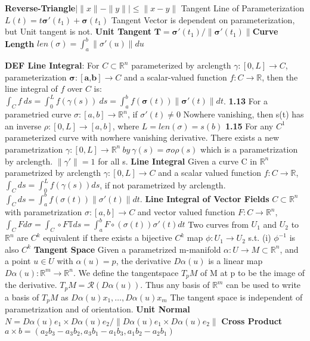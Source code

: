\documentclass[8pt]{extarticle}
\theoremstyle{definition}
\begin{document}
\textbf{Reverse-Triangle}$ | \|x\| - \|y\| | \leq \|x-y\|$ Tangent Line of Parameterization $L(t)  = t \mathbf{\sigma}'(t_1) + \mathbf{\sigma}(t_1) $ Tangent Vector is dependent on parameterization, but Unit tangent is not. \textbf{Unit Tangent} $\mathbf{T} = \mathbf{\sigma}'(t_1)/\|\mathbf{\sigma}'(t_1)  \|$\textbf{Curve Length} $len(\sigma) = \int^b_a \|\sigma ' (u)\|du$

\textbf{DEF Line Integral}: For $C \subset \mathbb{R}^n$ parameterized by arclength $\gamma: [0,L] \rightarrow C$, parameterization $\bm{\sigma}: [\textbf{a,b}] \rightarrow C$ and a scalar-valued function $f:C \rightarrow \mathbb{R}$, then the line integral of $f$ over $C$ is: $\int_C f~ds = \int_0^L f(\gamma(s))~ds = \int_a^b f(\bm{\sigma}(t)) \| \bm{\sigma}'(t) \| dt$. 
\textbf{1.13} For a parametried curve $\sigma: [a,b] \to \mathbb{R}^n$, if $\sigma'(t) \neq 0$ Nowhere vanishing, then s(t) has an inverse $\rho: [0,L] \to [a,b]$, where $L = len(\sigma) = s(b)$
\textbf{1.15} For any $C^1$ parameterized curve with nowhere vanishing derivative. There exists a new parametrization $\gamma:[0,L] \to \mathbb{R}^n~by~\gamma(s) = \sigma o \rho(s)$ which is a parametrization by arclength. $\|\gamma'\| = 1$ for all s.
\textbf{Line Integral} Given a curve C in $\mathbb{R}^n$ parametrized by arclength $\gamma :[0,L]\to C $ and a scalar valued function $f:C\to \mathbb{R}$, $\int_C ds = \int_0^L f(\gamma(s)) ds$, if not parametrized by arclength. $\int_C ds = \int_a^b f(\sigma(t)) \|\sigma'(t)\|dt$.
\textbf{Line Integral of Vector Fields} $C \subset \mathbb{R}^n$ with parametrization $\sigma:[a,b] \to C$ and vector valued function $F:C \to \mathbb{R}^n$, $\int_C F d\sigma = \int_C \circ F \mathbb{T}ds = \int_a^bF \circ (\sigma(t))  \sigma'(t)dt$
Two curves from $U_1$ and $U_2$ to $\mathbb{R}^n$ are $C^k$ equivalent if there exists a bijective $C^k$ map $\phi:U_1 \to U_2$ s.t. (i) $\phi^{-1} $ is also $C^k$
\textbf{Tangent Space} Given a parametrized m-manifold $\alpha :U \to M \subset \mathbb{R}^n$, and a point $u \in U $ with $\alpha(u) = p$, the derivative $D\alpha(u)$ is a linear map $D\alpha (u): \mathbb{R}^m \to \mathbb{R}^n$. We define the tangentspace $T_pM $ of M at p to be the image of the derivative. $T_pM = \mathscr{R}(D\alpha(u))$. Thus any basis of $\mathbb{R}^m$ can be used to write a basis of $T_pM$ as $D\alpha(u)x_1, \dots , D\alpha(u)x_m$ The tangent space is independent of parametrization and of orientation.
\textbf{Unit Normal} $N = D\alpha(u)e_1 \times D\alpha(u)e_2/\|D\alpha(u)e_1 \times D\alpha(u)e_2\|$
\textbf{Cross Product} $a \times b = (a_2b_3 - a_3b_2, a_3b_1 - a_1b_3, a_1b_2 - a_2b_1)$
\end{document}
